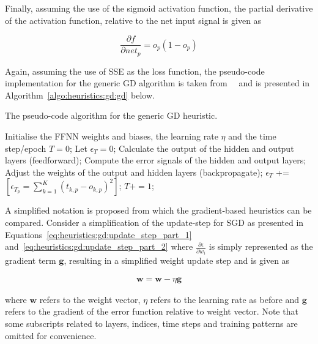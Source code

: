 Finally, assuming the use of the sigmoid activation function, the partial derivative of the activation function, relative to the net input signal is given as

\begin{equation}
	\label{eq:heuristics:gd:update_step_part_4}
	\frac{\partial f}{\partial net_{p}} = o_p(1 - o_{p})
\end{equation}

Again, assuming the use of \acs{SSE} as the loss function, the pseudo-code implementation for the generic \acs{GD} algorithm is taken from~\citeauthor{ref:engelbrecht:2007}~\cite{ref:engelbrecht:2007} and is presented in Algorithm~\ref{algo:heuristics:gd:gd} below.

\begin{algorithm}[htb]
	\caption{The pseudo-code algorithm for the generic \acf{GD} heuristic.}
	\label{algo:heuristics:gd:gd}
	\begin{algorithmic}
		\State Initialise the \acs{FFNN} weights and biases, the learning rate $\eta$ and the time step/epoch $T=0$;
		\State Let $\epsilon_{T} = 0$;
		\State Calculate the output of the hidden and output layers (feedforward);
		\State Compute the error signals of the hidden and output layers;
		\State Adjust the weights of the output and hidden layers (backpropagate);
		\State $\epsilon_{T}$ += $[\epsilon_{T_{p}} = \sum^{K}_{k=1}(t_{k,p} - o_{k,p})^{2}]$;
		\EndFor
		\State $T += 1$;
		\EndWhile
	\end{algorithmic}
\end{algorithm}

A simplified notation is proposed from which the gradient-based heuristics can be compared. Consider a simplification of the update-step for \acs{SGD} as presented in Equations~\eqref{eq:heuristics:gd:update_step_part_1} and~\eqref{eq:heuristics:gd:update_step_part_2} where $\frac{\partial \epsilon}{\partial w_{i}}$ is simply represented as the gradient term $\boldsymbol{g}$, resulting in a simplified weight update step and is given as

\begin{equation}
	\label{eq:heuristics:gd:sgd}
	\begin{split}
		\boldsymbol{w} = \boldsymbol{w} - \eta \boldsymbol{g}
	\end{split}
\end{equation}

where $\boldsymbol{w}$ refers to the weight vector, $\eta$ refers to the learning rate as before and $\boldsymbol{g}$ refers to the gradient of the error function relative to weight vector. Note that some subscripts related to layers, indices, time steps and training patterns are omitted for convenience.

